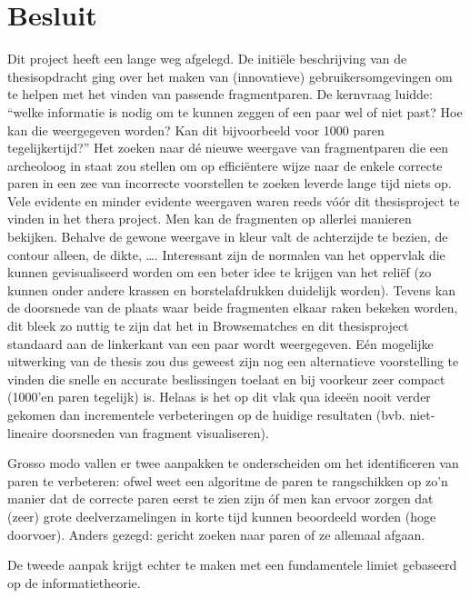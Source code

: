\chapter{Besluit}
\label{besluit}

Dit project heeft een lange weg afgelegd. De initi\"ele beschrijving van de thesisopdracht ging over het maken van (innovatieve) gebruikersomgevingen om te helpen met het vinden van passende fragmentparen. De kernvraag luidde: ``welke informatie is nodig om te kunnen zeggen of een paar wel of niet past? Hoe kan die weergegeven worden? Kan dit bijvoorbeeld voor 1000 paren tegelijkertijd?'' Het zoeken naar d\'e nieuwe weergave van fragmentparen die een archeoloog in staat zou stellen om op effici\"entere wijze naar de enkele correcte paren in een zee van incorrecte voorstellen te zoeken leverde lange tijd niets op.\\

Vele evidente en minder evidente weergaven waren reeds v\'o\'or dit thesisproject te vinden in het thera project. Men kan de fragmenten op allerlei manieren bekijken. Behalve de gewone weergave in kleur valt de achterzijde te bezien, de contour alleen, de dikte, \ldots. Interessant zijn de normalen van het oppervlak die kunnen gevisualiseerd worden om een beter idee te krijgen van het reli\"ef (zo kunnen onder andere krassen en borstelafdrukken duidelijk worden). Tevens kan de doorsnede van de plaats waar beide fragmenten elkaar raken bekeken worden, dit bleek zo nuttig te zijn dat het in Browsematches en dit thesisproject standaard aan de linkerkant van een paar wordt weergegeven. E\'en mogelijke uitwerking van de thesis zou dus geweest zijn nog een alternatieve voorstelling te vinden die snelle en accurate beslissingen toelaat en bij voorkeur zeer compact (1000'en paren tegelijk) is. Helaas is het op dit vlak qua idee\"en nooit verder gekomen dan incrementele verbeteringen op de huidige resultaten (bvb. niet-lineaire doorsneden van fragment visualiseren). 

Grosso modo vallen er twee aanpakken te onderscheiden om het identificeren van paren te verbeteren: ofwel weet een algoritme de paren te rangschikken op zo'n manier dat de correcte paren eerst te zien zijn \'of men kan ervoor zorgen dat (zeer) grote deelverzamelingen in korte tijd kunnen beoordeeld worden (hoge doorvoer). Anders gezegd: gericht zoeken naar paren of ze allemaal afgaan.

De tweede aanpak krijgt echter te maken met een fundamentele limiet gebaseerd op de informatietheorie.

